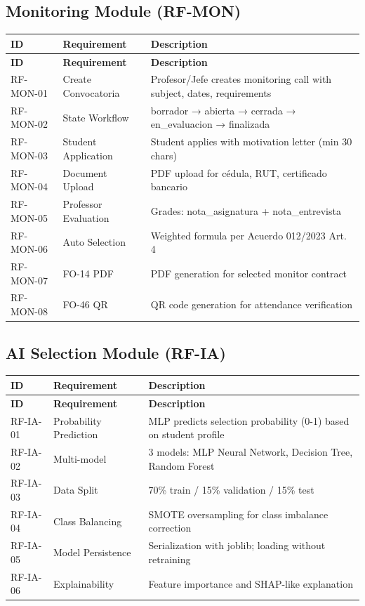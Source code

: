 \documentclass[12pt,a4paper]{report}
\begin{document}
\subsection{Monitoring Module (RF-MON)}
\begin{longtable}{|p{2.5cm}|p{3.5cm}|p{7cm}|}
\hline
\textbf{ID} & \textbf{Requirement} & \textbf{Description} \\
\hline
\endfirsthead
\hline \textbf{ID} & \textbf{Requirement} & \textbf{Description} \\ \hline \endhead
RF-MON-01 & Create Convocatoria & Profesor/Jefe creates monitoring call with subject, dates, requirements \\
\hline
RF-MON-02 & State Workflow & borrador → abierta → cerrada → en\_evaluacion → finalizada \\
\hline
RF-MON-03 & Student Application & Student applies with motivation letter (min 30 chars) \\
\hline
RF-MON-04 & Document Upload & PDF upload for cédula, RUT, certificado bancario \\
\hline
RF-MON-05 & Professor Evaluation & Grades: nota\_asignatura + nota\_entrevista \\
\hline
RF-MON-06 & Auto Selection & Weighted formula per Acuerdo 012/2023 Art. 4 \\
\hline
RF-MON-07 & FO-14 PDF & PDF generation for selected monitor contract \\
\hline
RF-MON-08 & FO-46 QR & QR code generation for attendance verification \\
\hline
\end{longtable}

\subsection{AI Selection Module (RF-IA)}
\begin{longtable}{|p{2.5cm}|p{3.5cm}|p{7cm}|}
\hline
\textbf{ID} & \textbf{Requirement} & \textbf{Description} \\
\hline
\endfirsthead
\hline \textbf{ID} & \textbf{Requirement} & \textbf{Description} \\ \hline \endhead
RF-IA-01 & Probability Prediction & MLP predicts selection probability (0-1) based on student profile \\
\hline
RF-IA-02 & Multi-model & 3 models: MLP Neural Network, Decision Tree, Random Forest \\
\hline
RF-IA-03 & Data Split & 70\% train / 15\% validation / 15\% test \\
\hline
RF-IA-04 & Class Balancing & SMOTE oversampling for class imbalance correction \\
\hline
RF-IA-05 & Model Persistence & Serialization with joblib; loading without retraining \\
\hline
RF-IA-06 & Explainability & Feature importance and SHAP-like explanation \\
\hline
\end{longtable}
\end{document}
